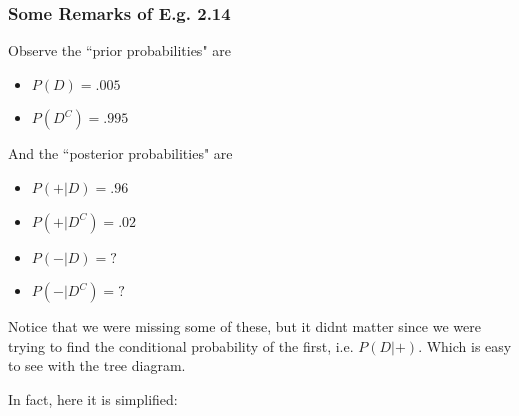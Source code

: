 \documentclass[12pt]{book}
\begin{document}
\subsubsection{Some Remarks of E.g. 2.14}
Observe the ``prior probabilities" are
\begin{itemize}
\item $P(D)=.005$
\item $P(D^C)=.995$
\end{itemize}
And the ``posterior probabilities" are
\begin{itemize}
\item $P(+|D)=.96$
\item $P(+|D^C)=.02$
\item $P(-|D)=?$
\item $P(-|D^C)=?$
\end{itemize}
Notice that we were missing some of these, but it didnt matter since we were trying to find the conditional probability of the first, i.e. $P(D|+)$. Which is easy to see with the tree diagram. 
\begin{center}
\end{center}
In fact, here it is simplified:
\end{document}

